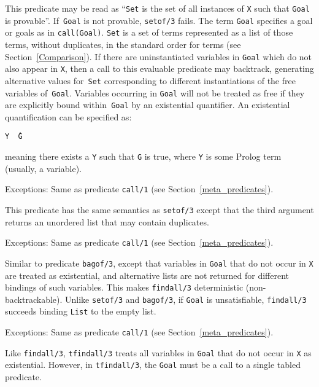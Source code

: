 \begin{description}
    This predicate may be read as ``{\tt Set} is the set of all instances 
    of {\tt X} such that {\tt Goal} is provable''.
    If~{\tt Goal} is not provable, {\tt setof/3} fails.
    The term {\tt Goal} specifies a goal or goals as in {\tt call(Goal)}.
    {\tt Set} is a set of terms represented as a list of those terms,
    without duplicates, in the standard order for terms 
    (see Section~\ref{Comparison}).
    If there are uninstantiated variables in {\tt Goal} which do not also 
    appear in {\tt X}, then a call to this evaluable predicate may backtrack,
    generating alternative values for~{\tt Set} corresponding to different
    instantiations of the free variables of~{\tt Goal}.
    Variables occurring in {\tt Goal} will not be treated as free if they 
    are explicitly bound within~{\tt Goal} by an existential quantifier.
    An existential quantification can be specified as:
    \begin{center}
    {\tt Y \^\ G}\index{\^}
    \end{center}
    meaning there exists a {\tt Y} such that {\tt G} is true,
    where {\tt Y} is some Prolog term (usually, a variable).
  
    Exceptions: Same as predicate {\tt call/1}
		(see Section~\ref{meta_predicates}).

    This predicate has the same semantics as {\tt setof/3} except that the 
    third argument returns an unordered list that may contain duplicates.

    Exceptions: Same as predicate {\tt call/1}
		(see Section~\ref{meta_predicates}).

    Similar to predicate {\tt bagof/3}, except that variables in {\tt Goal}
    that do not occur in {\tt X} are treated as existential, and alternative
    lists are not returned for different bindings of such variables.  This
    makes {\tt findall/3} deterministic (non-backtrackable).  Unlike
    {\tt setof/3} and {\tt bagof/3}, if {\tt Goal} is unsatisfiable,
    {\tt findall/3} succeeds binding {\tt List} to the empty list.

    Exceptions: Same as predicate {\tt call/1}
		(see Section~\ref{meta_predicates}).

\label{tfindall/3}
    Like {\tt findall/3}, {\tt tfindall/3} treats all variables in
    {\tt Goal} that do not occur in {\tt X} as existential.  However,
    in {\tt tfindall/3}, the {\tt Goal} must be a call to a single
    tabled predicate.
	

\end{description}
